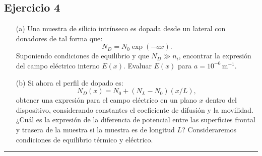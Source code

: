 \subsection{Ejercicio 4}

\begin{itemize}
\item[(a)] Una muestra de silicio intrínseco es dopada desde un lateral con donadores de tal forma que:
\[
	N_D = N_0 \exp(-ax).
\]
Suponiendo condiciones de equilibrio y que \(N_D \gg n_i\), encontrar la expresión del campo eléctrico interno \(E(x)\). Evaluar \(E(x)\) para \(a = 10^{-6} \, \text{m}^{-1}\).
\item[(b)] Si ahora el perfil de dopado es:
\[
	N_D(x) = N_0+(N_L-N_0)(x/L),
\]
obtener una expresión para el campo eléctrico en un plano \(x\) dentro del dispositivo, considerando constantes el coeficiente de difusión y la movilidad. ¿Cuál es la expresión de la diferencia de potencial entre las superficies frontal y trasera de la muestra si la muestra es de longitud \(L\)? Consideraremos condiciones de equilibrio térmico y eléctrico.
\end{itemize}


\rule{\textwidth}{0.1pt} \\[2pt]

